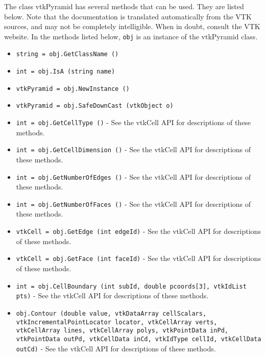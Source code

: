 The class vtkPyramid has several methods that can be used.
  They are listed below.
Note that the documentation is translated automatically from the VTK sources,
and may not be completely intelligible.  When in doubt, consult the VTK website.
In the methods listed below, \verb|obj| is an instance of the vtkPyramid class.
\begin{itemize}
\item  \verb|string = obj.GetClassName ()|

\item  \verb|int = obj.IsA (string name)|

\item  \verb|vtkPyramid = obj.NewInstance ()|

\item  \verb|vtkPyramid = obj.SafeDownCast (vtkObject o)|

\item  \verb|int = obj.GetCellType ()| -  See the vtkCell API for descriptions of these methods.

\item  \verb|int = obj.GetCellDimension ()| -  See the vtkCell API for descriptions of these methods.

\item  \verb|int = obj.GetNumberOfEdges ()| -  See the vtkCell API for descriptions of these methods.

\item  \verb|int = obj.GetNumberOfFaces ()| -  See the vtkCell API for descriptions of these methods.

\item  \verb|vtkCell = obj.GetEdge (int edgeId)| -  See the vtkCell API for descriptions of these methods.

\item  \verb|vtkCell = obj.GetFace (int faceId)| -  See the vtkCell API for descriptions of these methods.

\item  \verb|int = obj.CellBoundary (int subId, double pcoords[3], vtkIdList pts)| -  See the vtkCell API for descriptions of these methods.

\item  \verb|obj.Contour (double value, vtkDataArray cellScalars, vtkIncrementalPointLocator locator, vtkCellArray verts, vtkCellArray lines, vtkCellArray polys, vtkPointData inPd, vtkPointData outPd, vtkCellData inCd, vtkIdType cellId, vtkCellData outCd)| -  See the vtkCell API for descriptions of these methods.


\end{itemize}
